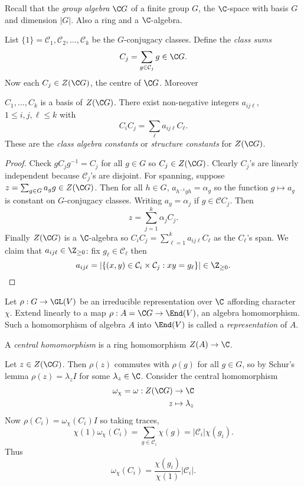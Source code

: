 \documentclass[a4paper]{article}
\newcommand{\ccl}{{\mathcal C}} %
\theoremstyle{definition}
\begin{document}
Recall that the \emph{group algebra} \(\C G\) of a finite group \(G\), the \(\C\)-space with basis \(G\) and dimension \(|G|\). Also a ring and a \(\C\)-algebra.

List \(\{1\} = \ccl_1, \ccl_2, \dots, \ccl_k\) be the \(G\)-conjugacy classes. Define the \emph{class sums}
\[
  C_j = \sum_{g \in \mathcal C_j} g \in \C G.
\]
Now each \(C_j \in Z(\C G)\), the centre of \(\C G\). Moreover
\begin{proposition}
  \(C_1, \dots, C_k\) is a basis of \(Z(\C G)\). There exist non-negative integers \(a_{ij\ell}\), \(1 \leq i, j, \ell \leq k\) with
  \[
    C_iC_j = \sum_\ell a_{ij\ell} C_\ell.
  \]
  These are the \emph{class algebra constants} or \emph{structure constants} for \(Z(\C G)\).
\end{proposition}

\begin{proof}
  Check \(g C_j g^{-1} = C_j\) for all \(g \in G\) so \(C_j \in Z(\C G)\). Clearly \(C_j\)'s are linearly independent because \(\ccl_j\)'s are disjoint. For spanning, suppose \(z = \sum_{g \in G} a_g g \in Z(\C G)\). Then for all \(h \in G\), \(a_{h^{-1}gh} = \alpha_g\) so the function \(g \mapsto a_g\) is constant on \(G\)-conjugacy classes. Writing \(a_g = \alpha_j\) if \(g \in \ccl C_j\). Then
  \[
    z = \sum_{j = 1}^k \alpha_j C_j.
  \]
  Finally \(Z(\C G)\) is a \(\C\)-algebra so \(C_iC_j = \sum_{\ell = 1}^k a_{ij\ell} C_\ell\) as the \(C_\ell\)'s span. We claim that \(a_{ij\ell} \in \Z_{\geq 0}\): fix \(g_\ell \in \ccl_\ell\) then
    \[
      a_{ij\ell} = |\{(x, y) \in \ccl_i \times \ccl_j: xy = g_\ell\}| \in \Z_{\geq 0}.
    \]
\end{proof}

\begin{definition}
  Let \(\rho: G \to \GL(V)\) be an irreducible representation over \(\C\) affording character \(\chi\). Extend linearly to a map \(\rho: A = \C G \to \End(V)\), an algebra homomorphism. Such a homomorphism of algebra \(A\) into \(\End(V)\) is called a \emph{representation} of \(A\).

  A \emph{central homomorphism} is a ring homomorphism \(Z(A) \to \C\).
\end{definition}

Let \(z \in Z(\C G)\). Then \(\rho(z)\) commutes with \(\rho(g)\) for all \(g \in G\), so by Schur's lemma \(\rho(z) = \lambda_z I\) for some \(\lambda_z \in \C\). Consider the central homomorphism
\begin{align*}
  \omega_\chi = \omega: Z(\C G) &\to \C \\
  z &\mapsto \lambda_z
\end{align*}
Now \(\rho(C_i) = \omega_\chi(C_i) I\) so taking traces,
\[
  \chi(1) \omega_\chi(C_i)
  = \sum_{g \in \ccl_i} \chi(g)
  = |\ccl_i| \chi(g_i).
\]
Thus
\[
  \omega_\chi(C_i) = \frac{\chi(g_i)}{\chi(1)} |\ccl_i|.
\]
\end{document}
